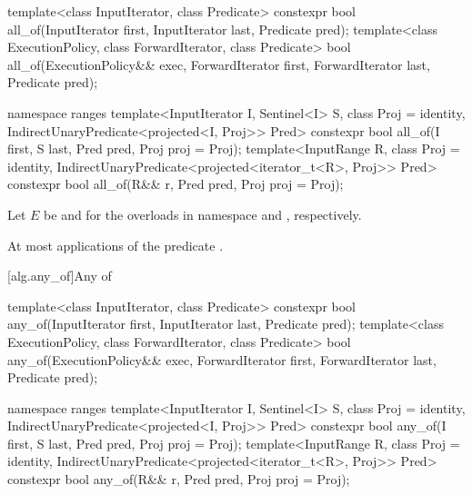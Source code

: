 %
\begin{itemdecl}
template<class InputIterator, class Predicate>
  constexpr bool all_of(InputIterator first, InputIterator last, Predicate pred);
template<class ExecutionPolicy, class ForwardIterator, class Predicate>
  bool all_of(ExecutionPolicy&& exec, ForwardIterator first, ForwardIterator last,
              Predicate pred);
\end{itemdecl}\begin{addedblock}\begin{itemdecl}
namespace ranges {
  template<InputIterator I, Sentinel<I> S, class Proj = identity,
      IndirectUnaryPredicate<projected<I, Proj>> Pred>
    constexpr bool all_of(I first, S last, Pred pred, Proj proj = Proj{});
  template<InputRange R, class Proj = identity,
      IndirectUnaryPredicate<projected<iterator_t<R>, Proj>> Pred>
    constexpr bool all_of(R&& r, Pred pred, Proj proj = Proj{});
}
\end{itemdecl}
\end{addedblock}

\begin{itemdescr}
\begin{addedblock}
\pnum
Let $E$ be  and 
for the overloads in namespace  and , respectively.
\end{addedblock}

\pnum
{}


\pnum
\complexity At most  applications of the predicate
.
\end{itemdescr}

[alg.any_of]{Any of}

%
\begin{itemdecl}
template<class InputIterator, class Predicate>
  constexpr bool any_of(InputIterator first, InputIterator last, Predicate pred);
template<class ExecutionPolicy, class ForwardIterator, class Predicate>
  bool any_of(ExecutionPolicy&& exec, ForwardIterator first, ForwardIterator last,
              Predicate pred);
\end{itemdecl}\begin{addedblock}\begin{itemdecl}
namespace ranges {
  template<InputIterator I, Sentinel<I> S, class Proj = identity,
      IndirectUnaryPredicate<projected<I, Proj>> Pred>
    constexpr bool any_of(I first, S last, Pred pred, Proj proj = Proj{});
  template<InputRange R, class Proj = identity,
      IndirectUnaryPredicate<projected<iterator_t<R>, Proj>> Pred>
    constexpr bool any_of(R&& r, Pred pred, Proj proj = Proj{});
}
\end{itemdecl}
\end{addedblock}

